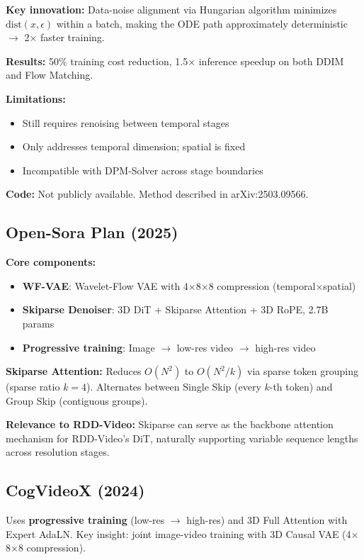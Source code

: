 \documentclass[11pt,a4paper]{article}
\begin{document}
\textbf{Key innovation:} Data-noise alignment via Hungarian algorithm minimizes $\text{dist}(x, \epsilon)$ within a batch, making the ODE path approximately deterministic $\to$ 2$\times$ faster training.

\textbf{Results:} 50\% training cost reduction, 1.5$\times$ inference speedup on both DDIM and Flow Matching.

\textbf{Limitations:}
\begin{itemize}[nosep]
\item Still requires renoising between temporal stages
\item Only addresses temporal dimension; spatial is fixed
\item Incompatible with DPM-Solver across stage boundaries
\end{itemize}

\textbf{Code:} Not publicly available. Method described in arXiv:2503.09566.

\subsection{Open-Sora Plan (2025)}

\textbf{Core components:}
\begin{itemize}[nosep]
\item \textbf{WF-VAE}: Wavelet-Flow VAE with 4$\times$8$\times$8 compression (temporal$\times$spatial)
\item \textbf{Skiparse Denoiser}: 3D DiT + Skiparse Attention + 3D RoPE, 2.7B params
\item \textbf{Progressive training}: Image $\to$ low-res video $\to$ high-res video
\end{itemize}

\textbf{Skiparse Attention:} Reduces $O(N^2)$ to $O(N^2/k)$ via sparse token grouping (sparse ratio $k=4$). Alternates between Single Skip (every $k$-th token) and Group Skip (contiguous groups).

\textbf{Relevance to RDD-Video:} Skiparse can serve as the backbone attention mechanism for RDD-Video's DiT, naturally supporting variable sequence lengths across resolution stages.

\subsection{CogVideoX (2024)}

Uses \textbf{progressive training} (low-res $\to$ high-res) and 3D Full Attention with Expert AdaLN. Key insight: joint image-video training with 3D Causal VAE (4$\times$8$\times$8 compression).
\end{document}
